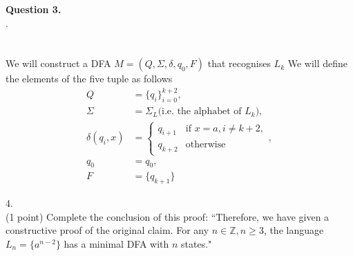 \documentclass{article}
\newenvironment{question}[2]
{
    {\large \textbf{Question #1.}}\\
    #2\\\\
}{\newpage}
\begin{document}
\begin{question}
    3.\\
    We will construct a DFA $M = (Q, \Sigma, \delta, q_0, F)$ that recognises $L_k$
    We will define the elements of the five tuple as follows
    \begin{align*}
        Q              & = \{q_i\}_{i=0}^{k+2},                          \\
        \Sigma         & = \Sigma_L \text{(i.e. the alphabet of $L_k$)}, \\
        \delta(q_i, x) & = \begin{cases}
                               q_{i+1}   & \text{if } x = a, i \neq k + 2, \\
                               q_{k + 2} & \text{otherwise}
                           \end{cases},   \\
        q_0            & = q_0,                                          \\
        F              & = \{q_{k+1}\}
    \end{align*}

    4.\\
    (1 point) Complete the conclusion of this proof: ``Therefore, we have given a
    constructive proof of the original claim. For any $n \in \mathbb{Z}, n \geq 3$, the
    language $L_n = \{a^{n-2}\}$ has a minimal DFA with $n$ states."

\end{question}
\end{document}
